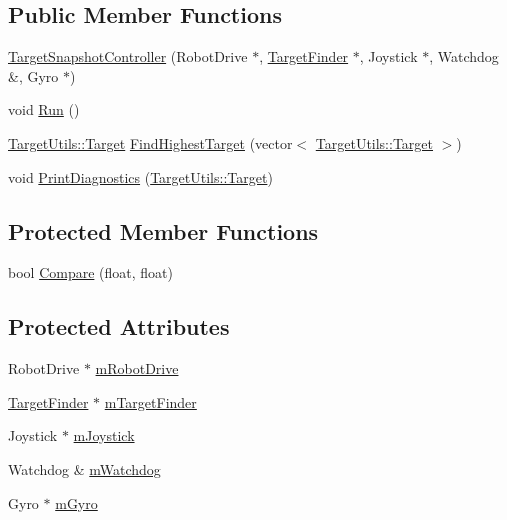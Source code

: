 \subsection*{\-Public \-Member \-Functions}
\begin{DoxyCompactItemize}
\item 
\hyperlink{class_target_snapshot_controller_af108d428d03acffd50dc30d4ed915923}{\-Target\-Snapshot\-Controller} (\-Robot\-Drive $\ast$, \hyperlink{class_target_finder}{\-Target\-Finder} $\ast$, \-Joystick $\ast$, \-Watchdog \&, \-Gyro $\ast$)
\item 
void \hyperlink{class_target_snapshot_controller_ab318752f39efc603202c43b1c82d80cc}{\-Run} ()
\item 
\hyperlink{struct_target_utils_1_1_target}{\-Target\-Utils\-::\-Target} \hyperlink{class_target_snapshot_controller_a28d3fc6d848da704588045656aa3e40c}{\-Find\-Highest\-Target} (vector$<$ \hyperlink{struct_target_utils_1_1_target}{\-Target\-Utils\-::\-Target} $>$)
\item 
void \hyperlink{class_target_snapshot_controller_ab21da3712c6b7028dc5ab44a75920a0a}{\-Print\-Diagnostics} (\hyperlink{struct_target_utils_1_1_target}{\-Target\-Utils\-::\-Target})
\end{DoxyCompactItemize}
\subsection*{\-Protected \-Member \-Functions}
\begin{DoxyCompactItemize}
\item 
bool \hyperlink{class_target_snapshot_controller_aed5339d5971deb85da11221769306764}{\-Compare} (float, float)
\end{DoxyCompactItemize}
\subsection*{\-Protected \-Attributes}
\begin{DoxyCompactItemize}
\item 
\-Robot\-Drive $\ast$ \hyperlink{class_target_snapshot_controller_a0da2fc7476e28875120c9ece11c07521}{m\-Robot\-Drive}
\item 
\hyperlink{class_target_finder}{\-Target\-Finder} $\ast$ \hyperlink{class_target_snapshot_controller_a743fe9d49f5c6e2305da1aa9b962fc5d}{m\-Target\-Finder}
\item 
\-Joystick $\ast$ \hyperlink{class_target_snapshot_controller_ad9a56e09a1b6508e976398543432b104}{m\-Joystick}
\item 
\-Watchdog \& \hyperlink{class_target_snapshot_controller_a9cb414dfbf515a98ddf6585a909d2cc3}{m\-Watchdog}
\item 
\-Gyro $\ast$ \hyperlink{class_target_snapshot_controller_adc7ee1057b81df61c0f2b605802f8395}{m\-Gyro}
\end{DoxyCompactItemize}
